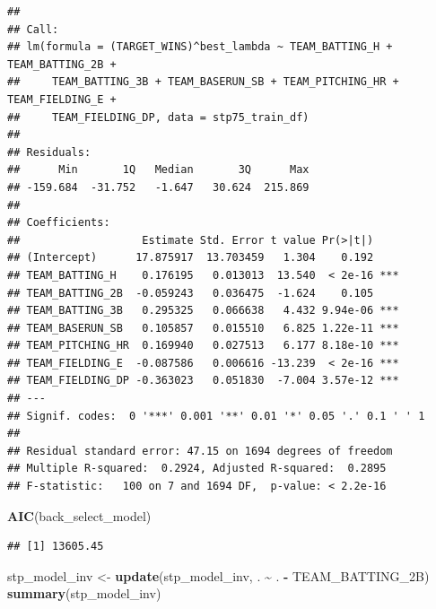 \documentclass[
]{article}
\newenvironment{Shaded}{\begin{snugshade}}{\end{snugshade}}
\newcommand{\FunctionTok}[1]{\textcolor[rgb]{0.13,0.29,0.53}{\textbf{#1}}}
\newcommand{\NormalTok}[1]{#1}
\newcommand{\OtherTok}[1]{\textcolor[rgb]{0.56,0.35,0.01}{#1}}
\newcommand{\SpecialCharTok}[1]{\textcolor[rgb]{0.81,0.36,0.00}{\textbf{#1}}}
\begin{document}
\begin{verbatim}
## 
## Call:
## lm(formula = (TARGET_WINS)^best_lambda ~ TEAM_BATTING_H + TEAM_BATTING_2B + 
##     TEAM_BATTING_3B + TEAM_BASERUN_SB + TEAM_PITCHING_HR + TEAM_FIELDING_E + 
##     TEAM_FIELDING_DP, data = stp75_train_df)
## 
## Residuals:
##      Min       1Q   Median       3Q      Max 
## -159.684  -31.752   -1.647   30.624  215.869 
## 
## Coefficients:
##                   Estimate Std. Error t value Pr(>|t|)    
## (Intercept)      17.875917  13.703459   1.304    0.192    
## TEAM_BATTING_H    0.176195   0.013013  13.540  < 2e-16 ***
## TEAM_BATTING_2B  -0.059243   0.036475  -1.624    0.105    
## TEAM_BATTING_3B   0.295325   0.066638   4.432 9.94e-06 ***
## TEAM_BASERUN_SB   0.105857   0.015510   6.825 1.22e-11 ***
## TEAM_PITCHING_HR  0.169940   0.027513   6.177 8.18e-10 ***
## TEAM_FIELDING_E  -0.087586   0.006616 -13.239  < 2e-16 ***
## TEAM_FIELDING_DP -0.363023   0.051830  -7.004 3.57e-12 ***
## ---
## Signif. codes:  0 '***' 0.001 '**' 0.01 '*' 0.05 '.' 0.1 ' ' 1
## 
## Residual standard error: 47.15 on 1694 degrees of freedom
## Multiple R-squared:  0.2924, Adjusted R-squared:  0.2895 
## F-statistic:   100 on 7 and 1694 DF,  p-value: < 2.2e-16
\end{verbatim}

\begin{Shaded}
\begin{Highlighting}[]
\FunctionTok{AIC}\NormalTok{(back\_select\_model)}
\end{Highlighting}
\end{Shaded}

\begin{verbatim}
## [1] 13605.45
\end{verbatim}

\begin{Shaded}
\begin{Highlighting}[]
\NormalTok{stp\_model\_inv }\OtherTok{\textless{}{-}} \FunctionTok{update}\NormalTok{(stp\_model\_inv, . }\SpecialCharTok{\textasciitilde{}}\NormalTok{ . }\SpecialCharTok{{-}}\NormalTok{ TEAM\_BATTING\_2B)}
\FunctionTok{summary}\NormalTok{(stp\_model\_inv)}
\end{Highlighting}
\end{Shaded}
\end{document}

